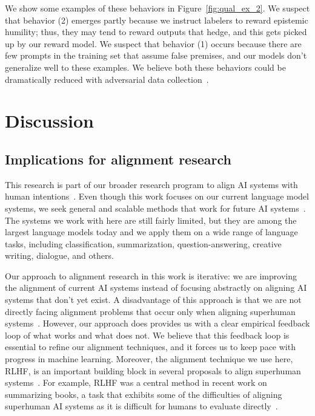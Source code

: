 \documentclass{article}
\begin{document}
We show some examples of these behaviors in Figure~\ref{fig:qual_ex_2}. We suspect that behavior (2) emerges partly because we instruct labelers to reward epistemic humility; thus, they may tend to reward outputs that hedge, and this gets picked up by our reward model. We suspect that behavior (1) occurs because there are few prompts in the training set that assume false premises, and our models don't generalize well to these examples. We believe both these behaviors could be dramatically reduced with adversarial data collection~\citep{dinan2019build}.


\section{Discussion}
\label{sec:discussion}

\subsection{Implications for alignment research}
\label{sec:implications-alignment}

This research is part of our broader research program to align AI systems with human intentions~\citep{christiano2017deep,ziegler2019fine,stiennon2020learning}. Even though this work focuses on our current language model systems, we seek general and scalable methods that work for future AI systems~\citep{leike2018scalable}. The systems we work with here are still fairly limited, but they are among the largest language models today and we apply them on a wide range of language tasks, including classification, summarization, question-answering, creative writing, dialogue, and others.

 Our approach to alignment research in this work is iterative: we are improving the alignment of current AI systems instead of focusing abstractly on aligning AI systems that don't yet exist. A disadvantage of this approach is that we are not directly facing alignment problems that occur only when aligning superhuman systems~\citep{bostrom2014superintelligence}. However, our approach does provides us with a clear empirical feedback loop of what works and what does not. We believe that this feedback loop is essential to refine our alignment techniques, and it forces us to keep pace with progress in machine learning. Moreover, the alignment technique we use here, RLHF, is an important building block in several proposals to align superhuman systems~\citep{leike2018scalable,irving2018ai,christiano2018supervising}. For example, RLHF was a central method in recent work on summarizing books, a task that exhibits some of the difficulties of aligning superhuman AI systems as it is difficult for humans to evaluate directly~\citep{wu2021recursively}.
\end{document}
